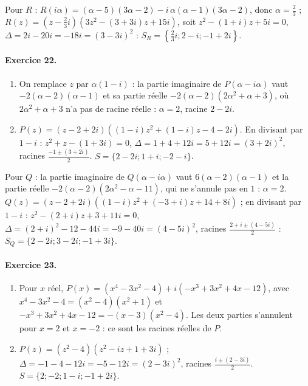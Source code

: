 \begin{corrige}
Pour $R$ : $R(i\alpha) = (\alpha - 5)(3\alpha - 2) - i\,\alpha(\alpha - 1)(3\alpha - 2)$, donc $\alpha = \frac{2}{3}$ ;
$R(z) = \left(z - \frac{2}{3}i\right)\left(3z^2 - (3+3i)z + 15i\right)$, soit $z^2 - (1+i)z + 5i = 0$, $\Delta = 2i - 20i = -18i = (3 - 3i)^2$ :
$S_R = \left\{\frac{2}{3}i ; 2 - i ; -1 + 2i\right\}$.

\paragraph{Exercice 22.}
\begin{enumerate}
\item On remplace $z$ par $\alpha(1 - i)$ : la partie imaginaire de $P(\alpha - i\alpha)$ vaut $-2(\alpha - 2)(\alpha - 1)$ et sa partie r\'eelle
      $-2(\alpha - 2)(2\alpha^2 + \alpha + 3)$, o\`u $2\alpha^2 + \alpha + 3$ n'a pas de racine r\'eelle : $\boxed{\alpha = 2}$, racine $2 - 2i$.
\item $P(z) = (z - 2 + 2i)\left((1-i)z^2 + (1-i)z - 4 - 2i\right)$.
      En divisant par $1 - i$ : $z^2 + z - (1 + 3i) = 0$, $\Delta = 1 + 4 + 12i = 5 + 12i = (3 + 2i)^2$, racines $\frac{-1 \pm (3 + 2i)}{2}$.
      $S = \{2 - 2i ; 1 + i ; -2 - i\}$.
\end{enumerate}
Pour $Q$ : la partie imaginaire de $Q(\alpha - i\alpha)$ vaut $6(\alpha - 2)(\alpha - 1)$ et la partie r\'eelle $-2(\alpha - 2)(2\alpha^2 - \alpha - 11)$, qui ne s'annule pas en $1$ : $\alpha = 2$.
$Q(z) = (z - 2 + 2i)\left((1-i)z^2 + (-3+i)z + 14 + 8i\right)$ ; en divisant par $1 - i$ : $z^2 - (2 + i)z + 3 + 11i = 0$,
$\Delta = (2+i)^2 - 12 - 44i = -9 - 40i = (4 - 5i)^2$, racines $\frac{2 + i \pm (4 - 5i)}{2}$ :
$S_Q = \{2 - 2i ; 3 - 2i ; -1 + 3i\}$.

\paragraph{Exercice 23.}
\begin{enumerate}
\item Pour $x$ r\'eel, $P(x) = (x^4 - 3x^2 - 4) + i(-x^3 + 3x^2 + 4x - 12)$, avec
      $x^4 - 3x^2 - 4 = (x^2 - 4)(x^2 + 1)$ et $-x^3 + 3x^2 + 4x - 12 = -(x - 3)(x^2 - 4)$.
      Les deux parties s'annulent pour $x = 2$ et $x = -2$ : ce sont les racines r\'eelles de $P$.
\item $P(z) = (z^2 - 4)\left(z^2 - iz + 1 + 3i\right)$ ; $\Delta = -1 - 4 - 12i = -5 - 12i = (2 - 3i)^2$, racines $\frac{i \pm (2 - 3i)}{2}$.
      $S = \{2 ; -2 ; 1 - i ; -1 + 2i\}$.
\end{enumerate}


\end{corrige}
